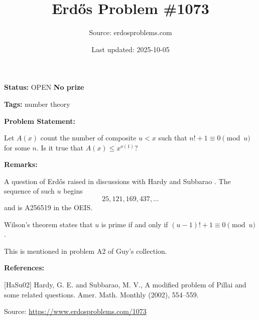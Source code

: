 \documentclass{article}
\title{Erd\H{o}s Problem \#1073}
\date{Last updated: 2025-10-05}
\author{Source: erdosproblems.com}
\begin{document}
\maketitle

\noindent\textbf{Status:} OPEN \quad \textbf{No prize}

\noindent\textbf{Tags:} number theory

\medskip
\noindent\textbf{Problem Statement:}

Let $A(x)$ count the number of composite $u<x$ such that $n!+1\equiv 0\pmod{u}$ for some $n$. Is it true that $A(x)\leq x^{o(1)}$?

\bigskip
\noindent\textbf{Remarks:}

A question of Erd\H{o}s raised in discussions with Hardy and Subbarao \cite{HaSu02}. The sequence of such $u$ begins\[25,121,169,437,\ldots\]and is A256519 in the OEIS.

Wilson's theorem states that $u$ is prime if and only if $(u-1)!+1\equiv 0\pmod{u}$.

This is mentioned in problem A2 of Guy's collection.

\bigskip
\noindent\textbf{References:}

[HaSu02] Hardy, G. E. and Subbarao, M. V., A modified problem of Pillai and some related questions. Amer. Math. Monthly (2002), 554--559.

\bigskip
\noindent\small{Source: \url{https://www.erdosproblems.com/1073}}
\end{document}
